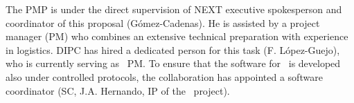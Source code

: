 %
 

\indent

The PMP is under the direct supervision of NEXT executive spokesperson and coordinator of this proposal (G\'omez-Cadenas). He is assisted by a project manager (PM) who combines an extensive technical preparation with experience in logistics. DIPC has hired a dedicated person for this task (F. L\'opez-Guejo), who is currently serving as \Next\ PM. To ensure that the software for \NHD\ is developed also under controlled protocols, the collaboration has appointed a software coordinator (SC, J.A. Hernando, IP of the \sUSC\ project). 

